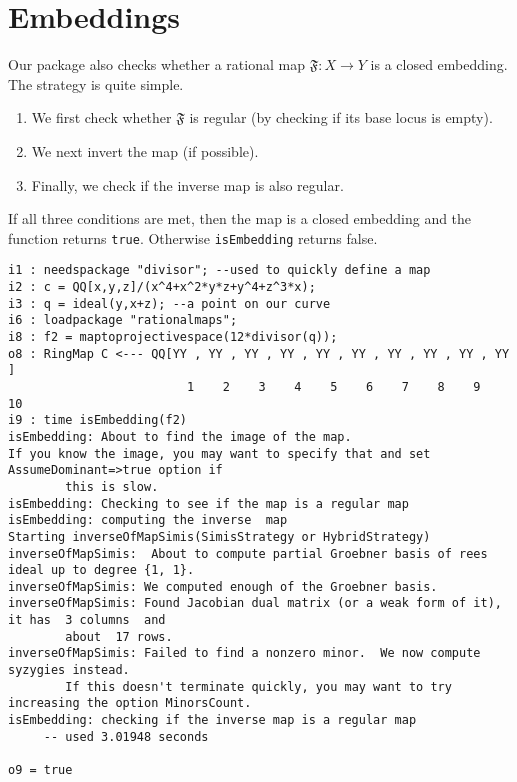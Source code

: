 \documentclass[11pt]{amsart}
\numberwithin{equation}{theorem}
\renewcommand{\:}{\colon}
\theoremstyle{theorem}
\begin{document}
{\color{black}\normalsize
\section{Embeddings}

Our package also checks whether a rational map $\mathfrak{F} : X \to Y$ is a closed embedding.  The strategy is quite simple.
\begin{enumerate}
\item  We first check whether $\mathfrak{F}$ is regular (by checking if its base locus is empty).
\item  We next invert the map (if possible).
\item  Finally, we check if the inverse map is also regular.
\end{enumerate}
If all three conditions are met, then the map is a closed embedding and the function returns {\tt true}.  Otherwise {\tt isEmbedding} returns false.
}
{\scriptsize
\color{blue}\begin{verbatim}
i1 : needspackage "divisor"; --used to quickly define a map
i2 : c = QQ[x,y,z]/(x^4+x^2*y*z+y^4+z^3*x);
i3 : q = ideal(y,x+z); --a point on our curve
i6 : loadpackage "rationalmaps";
i8 : f2 = maptoprojectivespace(12*divisor(q));
o8 : RingMap C <--- QQ[YY , YY , YY , YY , YY , YY , YY , YY , YY , YY  ]
                         1    2    3    4    5    6    7    8    9    10
i9 : time isEmbedding(f2)
isEmbedding: About to find the image of the map.
If you know the image, you may want to specify that and set AssumeDominant=>true option if
        this is slow.
isEmbedding: Checking to see if the map is a regular map
isEmbedding: computing the inverse  map
Starting inverseOfMapSimis(SimisStrategy or HybridStrategy)
inverseOfMapSimis:  About to compute partial Groebner basis of rees ideal up to degree {1, 1}.
inverseOfMapSimis: We computed enough of the Groebner basis.
inverseOfMapSimis: Found Jacobian dual matrix (or a weak form of it), it has  3 columns  and
        about  17 rows.
inverseOfMapSimis: Failed to find a nonzero minor.  We now compute syzygies instead.
        If this doesn't terminate quickly, you may want to try increasing the option MinorsCount.
isEmbedding: checking if the inverse map is a regular map
     -- used 3.01948 seconds

o9 = true
\end{verbatim}
}
\end{document}
